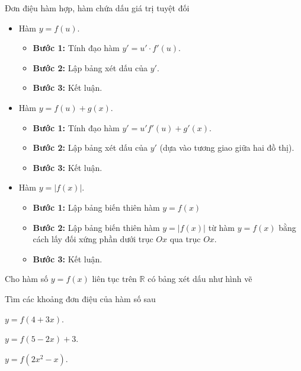 \newpage \begin{dang}{Đơn điệu hàm hợp, hàm chứa dấu giá trị tuyệt đối}
    \begin{itemize}
        \item Hàm $y=f(u)$.
        \begin{itemize}
            \item \textbf{Bước 1:} Tính đạo hàm $y'=u'\cdot f'(u)$.
            \item \textbf{Bước 2:} Lập bảng xét dấu của $y'$.
            \item \textbf{Bước 3:} Kết luận.
        \end{itemize}
        \item Hàm $y=f(u)+g(x)$.
        \begin{itemize}
            \item \textbf{Bước 1:} Tính đạo hàm $y'=u'f'(u)+g'(x)$.
            \item \textbf{Bước 2:} Lập bảng xét dấu của $y'$ (dựa vào tương giao giữa hai đồ thị).
            \item \textbf{Bước 3:} Kết luận.
        \end{itemize}
        \item Hàm $y=|f(x)|$.
        \begin{itemize}
            \item \textbf{Bước 1:} Lập bảng biến thiên hàm $y=f(x)$
            \item \textbf{Bước 2:} Lập bảng biến thiên hàm $y=|f(x)|$ từ hàm $y=f(x)$ bằng cách lấy đối xứng phần dưới trục $Ox$ qua trục $Ox$.
            \item \textbf{Bước 3:} Kết luận.
        \end{itemize}
    \end{itemize}
\end{dang}
\begin{vd}%
    Cho hàm số $y=f(x)$ liên tục trên $\mathbb{R}$ có bảng xét dấu như hình vẽ
    \begin{center}
    \end{center}
    Tìm các khoảng đơn điệu của hàm số sau
    \begin{listEX}[3]
        \item $y=f(4+3x)$.
        \item $y=f(5-2x)+3$.
        \item $y=f(2x^2-x)$.
    \end{listEX}
\end{vd}
